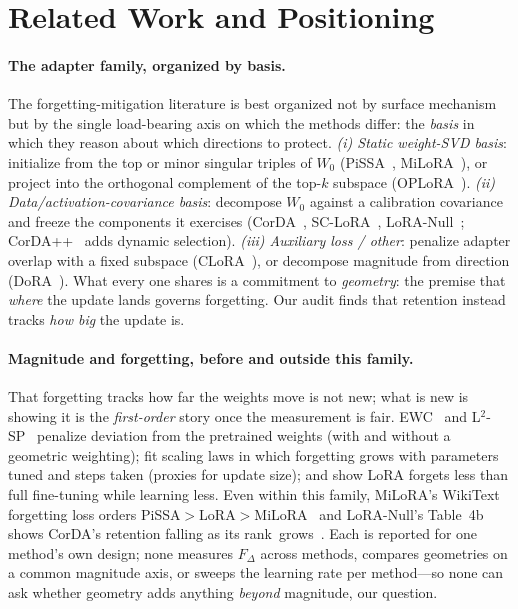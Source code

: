 \documentclass[11pt]{article}
\newcommand{\dw}{F_{\Delta}}
\begin{document}
\section{Related Work and Positioning}\label{sec:related}
\paragraph{The adapter family, organized by basis.} The forgetting-mitigation
literature is best organized not by surface mechanism but by the single
load-bearing axis on which the methods differ: the \emph{basis} in which they
reason about which directions to protect.
\emph{(i) Static weight-SVD basis}: initialize from the top or minor singular
triples of $W_0$ (PiSSA~\citep{meng2024pissa}, MiLoRA~\citep{wang2024milora}), or
project into the orthogonal complement of the top-$k$ subspace
(OPLoRA~\citep{xiong2025oplora}). \emph{(ii) Data/activation-covariance basis}:
decompose $W_0$ against a calibration covariance and freeze the components it
exercises (CorDA~\citep{yang2024corda}, SC-LoRA~\citep{luo2025sclora},
LoRA-Null~\citep{tang2025loranull}; CorDA++~\citep{yang2025cordapp} adds dynamic
selection). \emph{(iii) Auxiliary loss / other}: penalize adapter overlap with a
fixed subspace (CLoRA~\citep{clora}), or decompose magnitude from direction
(DoRA~\citep{liu2024dora}). What every one shares is a commitment to
\emph{geometry}: the premise that \emph{where} the update lands governs
forgetting. Our audit finds that retention instead tracks \emph{how big} the
update is.

\paragraph{Magnitude and forgetting, before and outside this family.} That
forgetting tracks how far the weights move is not new; what is new is showing it is the
\emph{first-order} story once the measurement is fair. EWC~\citep{kirkpatrick2017ewc}
and L$^2$-SP~\citep{li2018l2sp} penalize deviation from the pretrained weights
(with and without a geometric weighting); \citet{kalajdzievski2024scaling} fit
scaling laws in which forgetting grows with parameters tuned and steps taken
(proxies for update size); and \citet{biderman2024lora} show LoRA forgets less
than full fine-tuning while learning less. Even within this family, MiLoRA's
WikiText forgetting loss orders PiSSA${>}$LoRA${>}$MiLoRA~\citep{wang2024milora} and
LoRA-Null's Table~4b shows CorDA's retention falling as its
rank~grows~\citep{tang2025loranull}. Each is reported for one method's own design;
none measures $\dw$ across methods, compares geometries on a common magnitude
axis, or sweeps the learning rate per method---so none can ask whether geometry
adds anything \emph{beyond} magnitude, our question.
\end{document}
